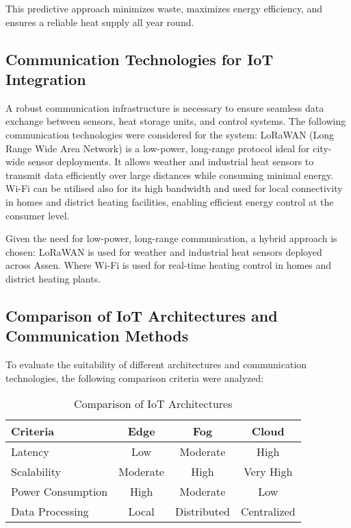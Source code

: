 \documentclass{article}
\begin{document}
This predictive approach minimizes waste, maximizes energy efficiency, and ensures a reliable heat supply all year round.

\subsection{Communication Technologies for IoT Integration}

A robust communication infrastructure is necessary to ensure seamless data exchange between sensors, heat storage units, and control systems. The following communication technologies were considered for the system:
LoRaWAN (Long Range Wide Area Network) is a low-power, long-range protocol ideal for city-wide sensor deployments. It allows weather and industrial heat sensors to transmit data efficiently over large distances while consuming minimal energy.
Wi-Fi can be utilised also for its high bandwidth and used for local connectivity in homes and district heating facilities, enabling efficient energy control at the consumer level.

Given the need for low-power, long-range communication, a hybrid approach is chosen:
LoRaWAN is used for weather and industrial heat sensors deployed across Assen. Where Wi-Fi is used for real-time heating control in homes and district heating plants.

\subsection{Comparison of IoT Architectures and Communication Methods}

To evaluate the suitability of different architectures and communication technologies, the following comparison criteria were analyzed:

\begin{table}[h]
\centering
\caption{Comparison of IoT Architectures}
\begin{tabular}{|l|c|c|c|}
\hline
\textbf{Criteria} & \textbf{Edge} & \textbf{Fog} & \textbf{Cloud} \\
\hline
Latency & Low & Moderate & High \\
Scalability & Moderate & High & Very High \\
Power Consumption & High & Moderate & Low \\
Data Processing & Local & Distributed & Centralized \\
\hline
\end{tabular}
\end{table}
\end{document}

